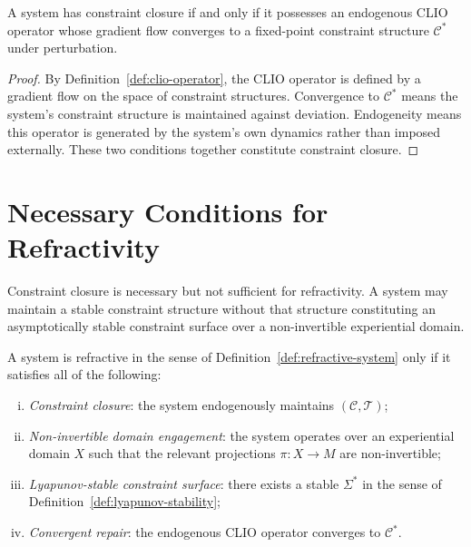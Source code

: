 \documentclass[11pt,openany]{book}
\begin{document}
\begin{proposition}
\label{prop:closure-clio}
A system has constraint closure if and only if it possesses
an endogenous CLIO operator whose gradient flow converges
to a fixed-point constraint structure $\mathcal{C}^*$
under perturbation.
\end{proposition}

\begin{proof}
By Definition~\ref{def:clio-operator}, the CLIO operator is
defined by a gradient flow on the space of constraint
structures.  Convergence to $\mathcal{C}^*$ means the
system's constraint structure is maintained against
deviation.  Endogeneity means this operator is generated by
the system's own dynamics rather than imposed externally.
These two conditions together constitute constraint closure.
\end{proof}

\section{Necessary Conditions for Refractivity}
\label{sec:conditions-refractivity}

Constraint closure is necessary but not sufficient for
refractivity.  A system may maintain a stable constraint
structure without that structure constituting an
asymptotically stable constraint surface over a
non-invertible experiential domain.

\begin{proposition}
\label{prop:necessary-refractive}
A system is refractive in the sense of
Definition~\ref{def:refractive-system} only if it satisfies
all of the following:
\begin{enumerate}[(i)]
  \item \emph{Constraint closure}: the system endogenously
    maintains $(\mathcal{C}, \mathcal{T})$;
  \item \emph{Non-invertible domain engagement}: the system
    operates over an experiential domain $X$ such that
    the relevant projections $\pi : X \to M$ are
    non-invertible;
  \item \emph{Lyapunov-stable constraint surface}: there
    exists a stable $\Sigma^*$ in the sense of
    Definition~\ref{def:lyapunov-stability};
  \item \emph{Convergent repair}: the endogenous CLIO
    operator converges to $\mathcal{C}^*$.
\end{enumerate}
\end{proposition}
\end{document}
